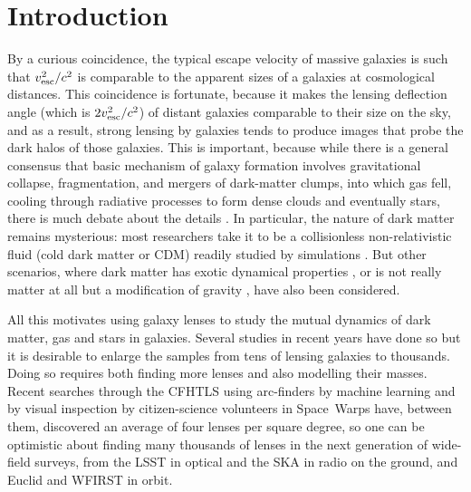 
\section{Introduction}

By a curious coincidence, the typical escape velocity of massive galaxies is
such that $v_{\rm esc}^2/c^2$ is comparable to the apparent sizes of a
galaxies at cosmological distances.  This coincidence is fortunate,
because it makes the lensing deflection angle (which is $2v_{\rm
  esc}^2/c^2$) of distant galaxies comparable to their size on the
sky, and as a result, strong lensing by galaxies tends to produce
images that probe the dark halos of those galaxies.  This is
important, because while there is a general consensus that basic
mechanism of galaxy formation involves gravitational collapse,
fragmentation, and mergers of dark-matter clumps, into which gas fell,
cooling through radiative processes to form dense clouds and
eventually stars, there is much debate about the details \citep[for a
  summary, see][]{2012RAA....12..917S}.  In particular, the nature of
dark matter remains mysterious: most researchers take it to be a
collisionless non-relativistic fluid (cold dark matter or CDM) readily
studied by simulations \citep[for example, the influential millenium
  simulation by][]{2005Natur.435..629S}.  But other scenarios, where
dark matter has exotic dynamical properties
\citep{2010MNRAS.405...77S,2016ApJ...818...89S}, or is not really
matter at all but a modification of gravity
\citep{2016PhRvL.117t1101M}, have also been considered.

All this motivates using galaxy lenses to study the mutual dynamics of
dark matter, gas and stars in galaxies.  Several studies in recent
years have done so
\citep{2009ApJ...703L..51K,2011ApJ...740...97L,2012MNRAS.424..104L,
  2016MNRAS.459.3677L,2016MNRAS.456..870B} but it is desirable to
enlarge the samples from tens of lensing galaxies to thousands.  Doing
so requires both finding more lenses and also modelling their masses.
Recent searches through the CFHTLS \citep{2012SPIE.8448E..0MC} using
arc-finders
\citep[e.g.,][]{2012ApJ...749...38M,2014A&A...567A.111M,2014ApJ...785..144G,2017arXiv170401585S}
by machine learning
\citep[e.g.,][]{2016A&A...592A..75P,2017arXiv170302642L} and by visual
inspection by citizen-science volunteers in Space~Warps
\citep{2016MNRAS.455.1191M} have, between them, discovered an average
of four lenses per square degree, so one can be optimistic about
finding many thousands of lenses in the next generation of wide-field
surveys, from the LSST in optical and the SKA in radio on the ground,
and Euclid and WFIRST in orbit.

